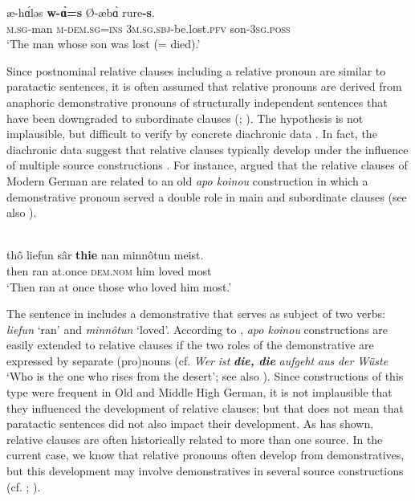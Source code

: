 \documentclass[output=paper,colorlinks,citecolor=brown]{langscibook}
\begin{document}
\ex\label{ex:diessel:4b}
\gll   æ-h\'ɑləs {\ob}\textbf{w-\`ɑ=s}     Ø-æb\`ɑ      rure\textbf{-s}{\cb}.\\
       \textsc{m.sg-}man {\db}\textsc{m-dem.sg=ins} \textsc{3m.sg.sbj-}be.lost\textsc{.pfv}  son\textsc{-3sg.poss}\\
\glt ‘The man whose son was lost (= died).’
\z
\z

Since postnominal relative clauses including a relative pronoun are similar to paratactic sentences, it is often assumed that relative pronouns are derived from anaphoric demonstrative pronouns of structurally independent sentences that have been downgraded to subordinate clauses (\citealt[224-229]{HeineKuteva2007}; \citealt[105]{Givón2009}). The hypothesis is not implausible, but difficult to verify by concrete diachronic data \citep[282-286]{HarrisCampbell1995}. In fact, the diachronic data suggest that relative clauses typically develop under the influence of multiple source constructions \citep{Hendery2013}. For instance, \citet{Lockwood1968} argued that the relative clauses of Modern German are related to an old \textit{apo koinou} construction in which a demonstrative pronoun served a double role in main and subordinate clauses  (see also \citealt{Pittner1995}).

\ea\label{ex:diessel:5}
\\
\gll   thô  liefun   sâr  \textbf{thie}   nan  minnôtun meist.\\
     then  ran  at.once  \textsc{dem.nom} him  loved  most\\
\glt ‘Then ran at once those who loved him most.’
\z

The sentence in  includes a demonstrative that serves as subject of two verbs: \textit{liefun} ‘ran’ and \textit{minnôtun} ‘loved’. According to \citet[242-244]{Lockwood1968}, \textit{apo koinou} constructions are easily extended to relative clauses if the two roles of the demonstrative are expressed by separate (pro)nouns (cf. \textit{Wer} \textit{ist} \textbf{\textit{die,} \textit{die}} \textit{aufgeht} \textit{aus} \textit{der} \textit{Wüste} ‘Who is the one who rises from the desert’; see also \citet[IV: 189-191]{Paul1916-1920}). Since constructions of this type were frequent in Old and Middle High German, it is not implausible that they influenced the development of relative clauses; but that does not mean that paratactic sentences did not also impact their development. As \citet{Hendery2013} has shown, relative clauses are often historically related to more than one source. In the current case, we know that relative pronouns often develop from demonstratives, but this development may involve demonstratives in several source constructions (cf. \citealt[378-383]{Lehmann1984}; \citealt[120-123]{Diessel1999Book}).
\end{document}
